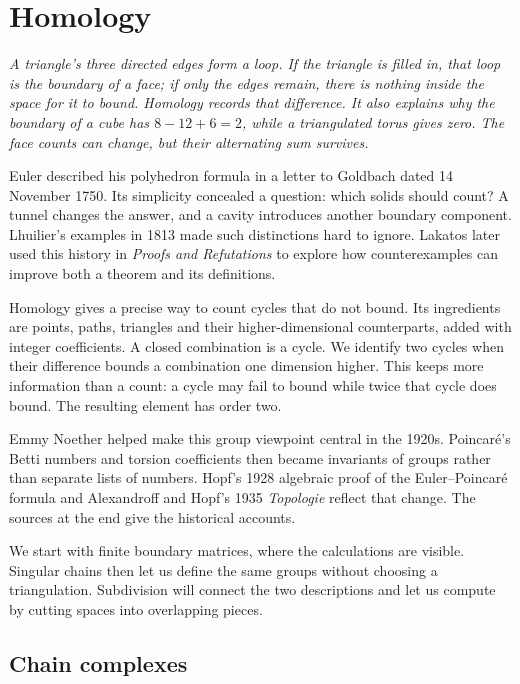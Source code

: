 \chapter{Homology}

\begin{center}\itshape
A triangle's three directed edges form a loop. If the triangle is filled in, that loop is the boundary of a face; if only the edges remain, there is nothing inside the space for it to bound. Homology records that difference. It also explains why the boundary of a cube has $8-12+6=2$, while a triangulated torus gives zero. The face counts can change, but their alternating sum survives.
\end{center}

Euler described his polyhedron formula in a letter to Goldbach dated 14 November 1750. Its simplicity concealed a question: which solids should count? A tunnel changes the answer, and a cavity introduces another boundary component. Lhuilier's examples in 1813 made such distinctions hard to ignore. Lakatos later used this history in \emph{Proofs and Refutations} to explore how counterexamples can improve both a theorem and its definitions.

Homology gives a precise way to count cycles that do not bound. Its ingredients are points, paths, triangles and their higher-dimensional counterparts, added with integer coefficients. A closed combination is a cycle. We identify two cycles when their difference bounds a combination one dimension higher. This keeps more information than a count: a cycle may fail to bound while twice that cycle does bound. The resulting element has order two.

Emmy Noether helped make this group viewpoint central in the 1920s. Poincar\'e's Betti numbers and torsion coefficients then became invariants of groups rather than separate lists of numbers. Hopf's 1928 algebraic proof of the Euler--Poincar\'e formula and Alexandroff and Hopf's 1935 \emph{Topologie} reflect that change. The sources at the end give the historical accounts.

We start with finite boundary matrices, where the calculations are visible. Singular chains then let us define the same groups without choosing a triangulation. Subdivision will connect the two descriptions and let us compute by cutting spaces into overlapping pieces.

\section{Chain complexes}

